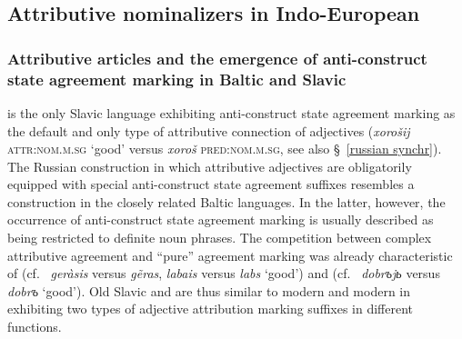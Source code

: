 \subsection{Attributive nominalizers in Indo-European} \label{ie diachr}

\subsubsection[Baltic and Slavic]{Attributive articles and the emergence of anti-construct state agreement marking in Baltic and Slavic} \label{slavic diachr}

 is the only Slavic language exhibiting anti-construct state agreement marking as the default and only type of attributive connection of adjectives (\textit{xorošij} \textsc{attr:nom.m.sg} ‘good’ versus \textit{xoroš} \textsc{pred:nom.m.sg}, see also \S~\ref{russian synchr}). The Russian construction in which attributive adjectives are obligatorily equipped with special anti-construct state agreement suffixes resembles a construction in the closely related Baltic languages. In the latter, however, the occurrence of anti-construct state agreement marking is usually described as being restricted to definite noun phrases. The competition between complex attributive agreement and “pure” agreement marking was already characteristic of  (cf.~ \textit{geràsis} versus \textit{g{\~e}ras},  \textit{labais} versus \textit{labs} ‘good’) and  (cf.~ \textit{dobrъjь} versus \textit{dobrъ} ‘good’). Old Slavic and  are thus similar to modern  and modern  in exhibiting two types of adjective attribution marking suffixes in different functions.

